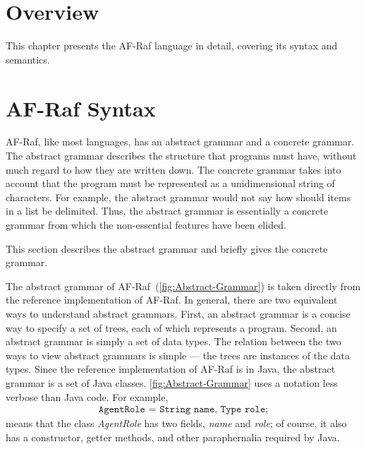 \documentclass[a4paper,12pt,oneside,fleqn]{book} %
\begin{document}
\section{Overview}\label{sec:langdef.overview} %

This chapter presents the AF-Raf language in detail, covering its syntax
and semantics.

\section{AF-Raf Syntax}\label{sec:langdef.syntax} %

AF-Raf, like most languages, has an abstract grammar and a concrete
grammar. The abstract grammar describes the structure that programs must
have, without much regard to how they are written down. The concrete
grammar takes into account that the program must be represented as a
unidimensional string of characters. For example, the abstract grammar
would not say how should items in a list be delimited. Thus, the abstract
grammar is essentially a concrete grammar from which the non-essential
features have been elided.

This section describes the abstract grammar and briefly gives the concrete
grammar.

The abstract grammar of AF-Raf~(\autoref{fig:Abstract-Grammar}) is taken
directly from the reference implementation of AF-Raf.  In general, there
are two equivalent ways to understand abstract grammars. First, an abstract
grammar is a concise way to specify a set of trees, each of which
represents a program. Second, an abstract grammar is simply a set of data
types. The relation between the two ways to view abstract grammars is
simple --- the trees are instances of the data types. Since the reference
implementation of AF-Raf is in Java, the abstract grammar is a set of Java
classes. \autoref{fig:Abstract-Grammar} uses a notation less verbose than
Java code. For example,
\begin{align}
\texttt{AgentRole = String name, Type role;}
\end{align}
means that the class {\it AgentRole\/} has two fields, {\it name\/} and
{\it role}; of course, it also has a constructor, getter methods, and other
paraphernalia required by Java.
\end{document}
